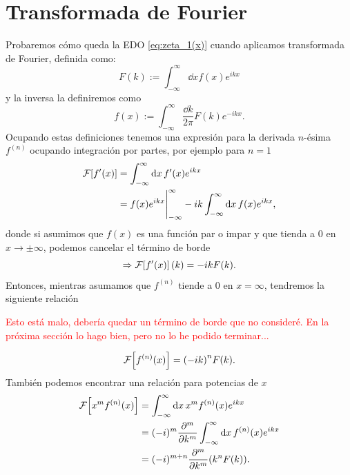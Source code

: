 \documentclass[%
 aip,
 jmp,%
 amsmath,amssymb,
 reprint,%
]{revtex4-2}
\begin{document}
\newpage

\section{Transformada de Fourier}

Probaremos c\'omo queda la EDO \eqref{eq:zeta_1(x)} cuando aplicamos transformada de Fourier, definida como:
\begin{equation}
    F(k) := \int_{-\infty}^{\infty}\dd{x}f(x)e^{ikx}
\end{equation}
y la inversa la definiremos como
\begin{equation}
    f(x) := \int_{-\infty}^{\infty}\frac{\dd{k}}{2\pi}F(k)e^{-ikx}.
\end{equation}
Ocupando estas definiciones tenemos una expresi\'on para la derivada $n$-\'esima $f^{(n)}$ ocupando integraci\'on por partes, por ejemplo para $n=1$
\begin{equation*}
\begin{aligned}
    \mathcal{F}\qty[f'(x)] &= \int_{-\infty}^{\infty} \dd{x} f'(x)e^{ikx}\\
    &= f(x)e^{ikx}\Bigg|_{-\infty}^\infty - ik\int_{-\infty}^{\infty} \dd{x} f(x)e^{ikx},
\end{aligned}
\end{equation*}
donde si asumimos que $f(x)$ es una funci\'on par o impar y que tienda a $0$ en $x\to\pm\infty$, podemos cancelar el t\'ermino de borde
\begin{equation*}
    \Rightarrow \mathcal{F}\qty[f'(x)](k) = -ikF(k).
\end{equation*}
Entonces, mientras asumamos que $f^{(n)}$ tiende a 0 en $x = \infty$, tendremos la siguiente relaci\'on
\begin{center}
    {\large \textcolor{red}{Esto está malo, debería quedar un término de borde que no consideré. En la próxima sección lo hago bien, pero no lo he podido terminar...}}
\end{center}
\begin{equation}
    \mathcal{F}\qty[f^{(n)}(x)] = \qty(-ik)^nF(k).
\end{equation}
Tambi\'en podemos encontrar una relaci\'on para potencias de $x$
\begin{equation*}
\begin{aligned}
    \mathcal{F}\qty[x^mf^{(n)}(x)] &= \int_{-\infty}^\infty \dd{x} x^mf^{(n)}(x)e^{ikx}\\
    &= (-i)^m\pdv[m]{k}\int_{-\infty}^\infty \dd{x} f^{(n)}(x)e^{ikx}\\
    &= (-i)^{m+n}\pdv[m]{k} \qty(k^n F(k)).
\end{aligned}
\end{equation*}
\end{document}
